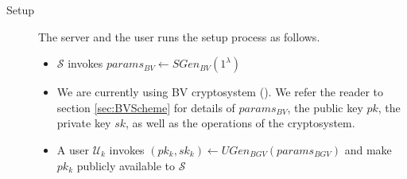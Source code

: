 \begin{description}
	\item[Setup] The server and the user runs the setup process as
	follows.
	\begin{itemize}




		\item $\mathcal{S}$ invokes $params_{BV} \gets
		SGen_{BV}(1^\lambda)$
		\item We are currently using BV cryptosystem
		(\cite{brakerski2011fully}). We refer the reader to section
		\ref{sec:BVScheme} for details of $params_{BV}$, the public
		key $pk$, the private key $sk$, as well as the
		operations of the
		cryptosystem.
		\item A user $\mathcal{U}_k$ invokes $(pk_k,sk_k) \gets
		UGen_{BGV}(params_{BGV})$ and make $pk_k$ publicly
		available to $\mathcal{S}$




		\iffalse
		\item $\mathcal{S}$ invokes $params_{GSW} \gets
		SGen_{GSW}(1^\lambda)$
		\item We are currently using GSW cryptosystem
		(\cite{gentry2013homomorphic}).
		We refer the reader to section
		\missref{} for details of $params_{GSW}$, the public
		key $pk$, the private key $sk$, as well as the
		homomorphic operations of the
		cryptosystem.
		\item A user $\mathcal{U}_k$ invokes $(pk_k,sk_k) \gets
		UGen_{GSW}(params_{GSW})$ and make $pp_k$ publicly
		available to $\mathcal{S}$
		\fi



\end{itemize}
\end{description}
